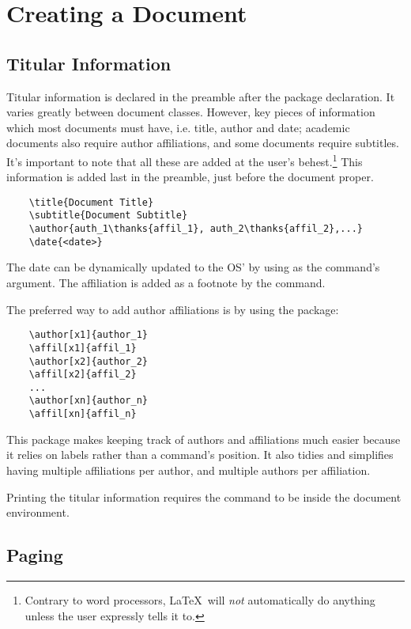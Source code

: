 \chapter{Creating a Document}
\section{Titular Information}
%

Titular information is declared in the preamble after the package
declaration.  It varies greatly between document classes.  However,
key pieces of information which most documents must have, i.e. title,
author and date; academic documents also require author affiliations,
and some documents require subtitles.  It's important to note that all
these are added at the user's behest.\footnote{Contrary to word
  processors, \LaTeX~will \emph{not} automatically do anything unless
  the user expressly tells it to.} This information is added last in
the preamble, just before the document proper.
\begin{verbatim}
	\title{Document Title}
	\subtitle{Document Subtitle}
	\author{auth_1\thanks{affil_1}, auth_2\thanks{affil_2},...}
	\date{<date>}
\end{verbatim}
The date can be dynamically updated to the OS' by using 
as the  command's argument.  The affiliation is added as
a footnote by the  command.

The preferred way to add author affiliations is by using the
 package:
\begin{verbatim}
	\author[x1]{author_1}
	\affil[x1]{affil_1}
	\author[x2]{author_2}
	\affil[x2]{affil_2}
	...
	\author[xn]{author_n}
	\affil[xn]{affil_n}
\end{verbatim}
This package makes keeping track of authors and affiliations much
easier because it relies on labels rather than a command's position.
It also tidies and simplifies having multiple affiliations per author,
and multiple authors per affiliation.

Printing the titular information requires the command
 to be inside the document environment.

%
\section{Paging}
%


